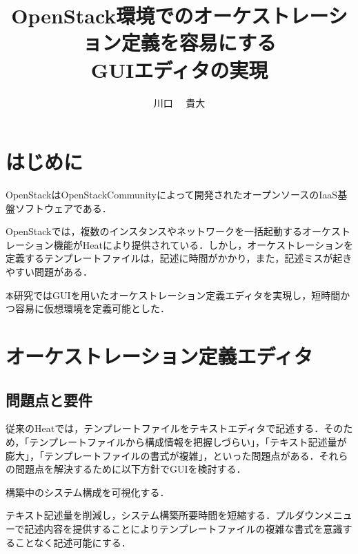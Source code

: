 \documentclass[a4j]{jarticle}
\title{OpenStack環境でのオーケストレーション定義を容易にする\\GUIエディタの実現}
\author{川口 ~~貴大}
\begin{document}
\begin{Abstract}
 
 \section{はじめに}
 OpenStackはOpenStackCommunityによって開発されたオープンソースのIaaS基盤ソフトウェアである．\cite{Document:1}
 
 OpenStackでは，複数のインスタンスやネットワークを一括起動するオーケストレーション機能がHeatにより提供されている．しかし，オーケストレーションを定義するテンプレートファイルは，記述に時間がかかり，また，記述ミスが起きやすい問題がある．
 
 \texttt 本研究ではGUIを用いたオーケストレーション定義エディタを実現し，短時間かつ容易に仮想環境を定義可能とした．
 \section{オーケストレーション定義エディタ}
 \subsection{問題点と要件}
 従来のHeatでは，テンプレートファイルをテキストエディタで記述する．そのため，「テンプレートファイルから構成情報を把握しづらい」，「テキスト記述量が膨大」，「テンプレートファイルの書式が複雑」，といった問題点がある．それらの問題点を解決するために以下方針でGUIを検討する．
 \begin{description}
 	\vspace{-2mm}
 	\item[(GUIを採用)]構築中のシステム構成を可視化する．
 	\vspace{-2mm}
 	\item[(テキスト入力を撤廃)]テキスト記述量を削減し，システム構築所要時間を短縮する．プルダウンメニューで記述内容を提供することによりテンプレートファイルの複雑な書式を意識することなく記述可能にする．
 	\vspace{-2mm}
 \end{description}
 \vspace{-1mm}

\end{Abstract}
\end{document}
